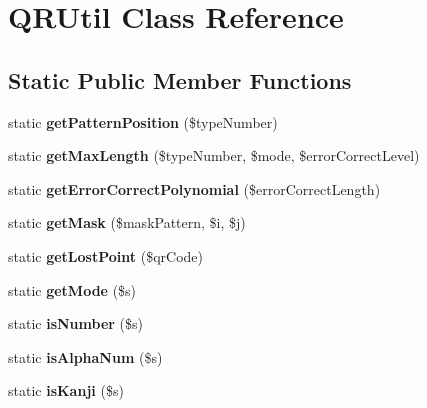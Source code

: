 \hypertarget{class_q_r_util}{}\section{Q\+R\+Util Class Reference}
\label{class_q_r_util}
\subsection*{Static Public Member Functions}
\begin{DoxyCompactItemize}
\item 
\mbox{\label{class_q_r_util_acea27b4f167ec78ca9e3734516bc41d2}} 
static {\bfseries get\+Pattern\+Position} (\$type\+Number)
\item 
\mbox{\label{class_q_r_util_a86334dec40c3e321aa56bde8e8a25850}} 
static {\bfseries get\+Max\+Length} (\$type\+Number, \$mode, \$error\+Correct\+Level)
\item 
\mbox{\label{class_q_r_util_ac5a3affdfda6227e17e0b23177fc7391}} 
static {\bfseries get\+Error\+Correct\+Polynomial} (\$error\+Correct\+Length)
\item 
\mbox{\label{class_q_r_util_a07e45b44ddd3610d3cf1bd16ac6c1811}} 
static {\bfseries get\+Mask} (\$mask\+Pattern, \$i, \$j)
\item 
\mbox{\label{class_q_r_util_abaa1fdb8b71a7db18fc2d99eb5d0b5da}} 
static {\bfseries get\+Lost\+Point} (\$qr\+Code)
\item 
\mbox{\label{class_q_r_util_a5c367a86abc3c3b4ce2468346a271aaf}} 
static {\bfseries get\+Mode} (\$s)
\item 
\mbox{\label{class_q_r_util_aff3e62f6c128364901ad84b5171bfdee}} 
static {\bfseries is\+Number} (\$s)
\item 
\mbox{\label{class_q_r_util_a7f55d78a50e60a514df46bd7b41b94dd}} 
static {\bfseries is\+Alpha\+Num} (\$s)
\item 
\mbox{\label{class_q_r_util_a1d98a98b33d8b14c5469696376344191}} 
static {\bfseries is\+Kanji} (\$s)
\item 

\end{DoxyCompactItemize}
